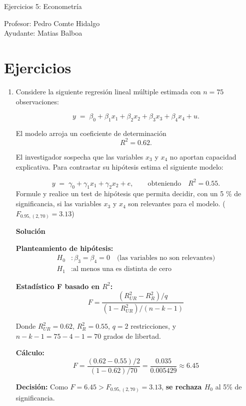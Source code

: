 \documentclass[10pt,a4paper]{article}
\begin{document}
\vspace{5cm}

\begin{center}
    {\Large  Ejercicios 5: Econometría }

Profesor:    Pedro Comte Hidalgo \\
Ayudante: Matias Balboa
\end{center}



\section{Ejercicios}
\begin{enumerate}
    \item Considere la siguiente regresión lineal múltiple estimada con \(n = 75\) observaciones:

\[
y \;=\; \beta_{0} + \beta_{1}x_{1} + \beta_{2}x_{2} + \beta_{3}x_{3} + \beta_{4}x_{4} + u.
\]

El modelo arroja un coeficiente de determinación
\[
R^2 = 0.62.
\]

El investigador sospecha que las variables \(x_{3}\) y \(x_{4}\) no aportan capacidad explicativa.  
Para contrastar su hipótesis estima el siguiente modelo:

\[
y \;=\; \gamma_{0} + \gamma_{1}x_{1} + \gamma_{2}x_{2} + e,
\qquad\text{obteniendo}\quad
R^2 = 0.55.
\]
Formule y realice un test de hipótesis que permita decidir, con un 5 \% de significancia, si las variables \(x_{3}\) y \(x_{4}\) son relevantes para el modelo. ($F_{0.95,(2,70)}=3.13$)

\textbf{Solución}


\textbf{Planteamiento de hipótesis:}
\begin{align*}
H_0 &: \beta_3 = \beta_4 = 0 \quad \text{(las variables no son relevantes)} \\
H_1 &: \text{al menos una es distinta de cero}
\end{align*}

\textbf{Estadístico F basado en \(R^2\):}
\[
F = \frac{(R^2_{UR} - R^2_R)/q}{(1-R^2_{UR})/(n-k-1)}
\]

Donde \(R^2_{UR} = 0.62\), \(R^2_R = 0.55\), \(q = 2\) restricciones, y \(n - k - 1 = 75 - 4 - 1 = 70\) grados de libertad.

\textbf{Cálculo:}
\[
F = \frac{(0.62 - 0.55)/2}{(1-0.62)/70} = \frac{0.035}{0.005429} \approx 6.45
\]

\textbf{Decisión:} Como \(F = 6.45 > F_{0.95,(2,70)} = 3.13\), \textbf{se rechaza \(H_0\)} al 5\% de significancia.


\end{enumerate}
\end{document}
